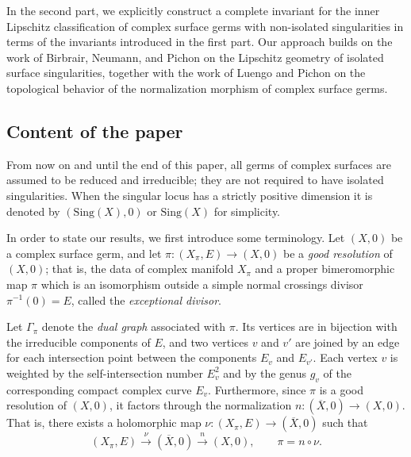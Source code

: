 \documentclass[reqno,dvipsnames,12pt]{amsart}
\begin{document}
In the second part, we explicitly construct a complete invariant for the inner Lipschitz classification of complex surface germs with non-isolated singularities in terms of the invariants introduced in the first part. Our approach builds on the work of Birbrair, Neumann, and Pichon \cite{BNP} on the Lipschitz geometry of isolated surface singularities, together with the work of Luengo and Pichon \cite{luengopichon} on the topological behavior of the normalization morphism of complex surface germs. 







   

    



     
     
     



\subsection*{Content of the paper}
From now on and until the end of this paper, all germs of complex surfaces are assumed to be reduced and irreducible; they are not required to have isolated singularities. 
When the singular locus has a strictly positive dimension it is  denoted by $(\mathrm{Sing}(X),0)$ or $\mathrm{Sing}(X)$ for simplicity.




In order to state our results, we first introduce some terminology. Let $(X,0)$ be a complex surface germ, and let $\pi : (X_\pi, E) \longrightarrow (X,0)$ be a \textit{good resolution} of $(X,0)$; that is, the data of complex manifold $X_{\pi}$ and a proper bimeromorphic map $\pi$ which is an isomorphism outside a simple normal crossings divisor $\pi^{-1}(0) = E$, called the \textit{exceptional divisor}.

Let $\Gamma_\pi$ denote the \textit{dual graph} associated with $\pi$. Its vertices are in bijection with the irreducible components of $E$, and two vertices $v$ and $v'$ are joined by an edge for each intersection point between the components $E_v$ and $E_{v'}$. Each vertex $v$ is weighted by the self-intersection number $E_v^2$ and by the genus $g_v$ of the corresponding compact complex curve $E_v$. Furthermore, since $\pi$ is a good resolution of $(X,0)$, it factors through the normalization $n : (\overline{X},0) \to (X,0).$ That is, there exists a holomorphic map
$\nu : (X_\pi, E) \to (\overline{X},0)$ such that
$$(X_\pi, E) \xrightarrow{\ \nu\ } (\overline{X},0) \xrightarrow{\ n\ } (X,0),
\qquad \pi = n \circ \nu.$$
\end{document}
